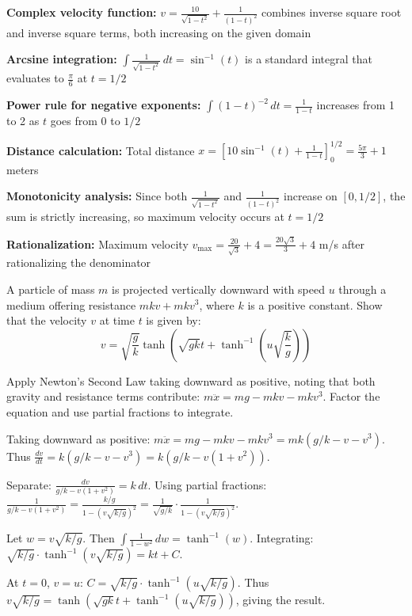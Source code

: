 \begin{takeaways}
\item \textbf{Complex velocity function:} $v = \frac{10}{\sqrt{1-t^2}} + \frac{1}{(1-t)^2}$ combines inverse square root and inverse square terms, both increasing on the given domain
\item \textbf{Arcsine integration:} $\int \frac{1}{\sqrt{1-t^2}}\,dt = \sin^{-1}(t)$ is a standard integral that evaluates to $\frac{\pi}{6}$ at $t = 1/2$
\item \textbf{Power rule for negative exponents:} $\int (1-t)^{-2}\,dt = \frac{1}{1-t}$ increases from 1 to 2 as $t$ goes from 0 to $1/2$
\item \textbf{Distance calculation:} Total distance $x = [10\sin^{-1}(t) + \frac{1}{1-t}]_0^{1/2} = \frac{5\pi}{3} + 1$ meters
\item \textbf{Monotonicity analysis:} Since both $\frac{1}{\sqrt{1-t^2}}$ and $\frac{1}{(1-t)^2}$ increase on $[0, 1/2]$, the sum is strictly increasing, so maximum velocity occurs at $t = 1/2$
\item \textbf{Rationalization:} Maximum velocity $v_{\max} = \frac{20}{\sqrt{3}} + 4 = \frac{20\sqrt{3}}{3} + 4$ m/s after rationalizing the denominator
\end{takeaways}

\begin{problem}
A particle of mass $m$ is projected vertically downward with speed $u$ through a medium offering resistance $mkv + mkv^3$, where $k$ is a positive constant. Show that the velocity $v$ at time $t$ is given by:
\[
v = \sqrt{\frac{g}{k}} \tanh\left(\sqrt{gk}t + \tanh^{-1}\left(u\sqrt{\frac{k}{g}}\right)\right)
\]
\end{problem}

\begin{hint}
Apply Newton's Second Law taking downward as positive, noting that both gravity and resistance terms contribute: $m\ddot{x} = mg - mkv - mkv^3$. Factor the equation and use partial fractions to integrate.
\end{hint}

\begin{solution}
Taking downward as positive: $m\ddot{x} = mg - mkv - mkv^3 = mk(g/k - v - v^3)$. Thus $\frac{dv}{dt} = k(g/k - v - v^3) = k(g/k - v(1 + v^2))$.

Separate: $\frac{dv}{g/k - v(1 + v^2)} = k\,dt$. Using partial fractions: $\frac{1}{g/k - v(1 + v^2)} = \frac{k/g}{1 - (v\sqrt{k/g})^2} = \frac{1}{\sqrt{g/k}} \cdot \frac{1}{1 - (v\sqrt{k/g})^2}$.

Let $w = v\sqrt{k/g}$. Then $\int \frac{1}{1 - w^2}\,dw = \tanh^{-1}(w)$. Integrating: $\sqrt{k/g} \cdot \tanh^{-1}(v\sqrt{k/g}) = kt + C$.

At $t = 0$, $v = u$: $C = \sqrt{k/g} \cdot \tanh^{-1}(u\sqrt{k/g})$. Thus $v\sqrt{k/g} = \tanh(\sqrt{gk}t + \tanh^{-1}(u\sqrt{k/g}))$, giving the result.
\end{solution}

